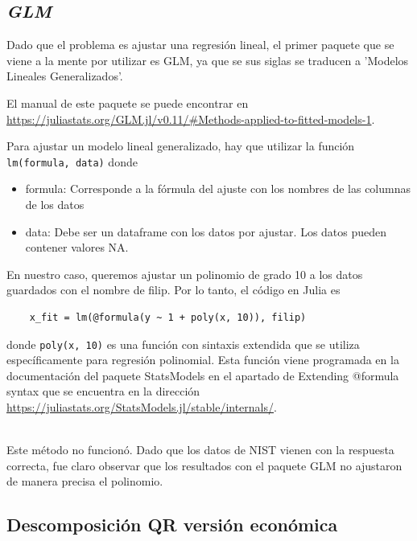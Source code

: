 \subsection{\textit{GLM}}

Dado que el problema es ajustar una regresión lineal, el primer paquete que se viene a la mente por utilizar es \textsf{GLM}, ya que se sus siglas se traducen a 'Modelos Lineales Generalizados'.


El manual de este paquete se puede encontrar en \url{https://juliastats.org/GLM.jl/v0.11/#Methods-applied-to-fitted-models-1}.  

Para ajustar un modelo lineal generalizado, hay que utilizar la función \texttt{lm(formula, data)} donde 

\begin{itemize}
    \item formula: 
    Corresponde a la fórmula del ajuste con los nombres de las columnas de los datos
    \item data:
    Debe ser un dataframe con los datos por ajustar. Los datos pueden contener valores NA. 
\end{itemize}

En nuestro caso, queremos ajustar un polinomio de grado 10 a los datos guardados con el nombre de filip. Por lo tanto, el código en Julia es

\begin{verbatim}
    x_fit = lm(@formula(y ~ 1 + poly(x, 10)), filip)
\end{verbatim}

donde \texttt{poly(x, 10)} es una función con sintaxis extendida que se utiliza específicamente para regresión polinomial. Esta función viene programada en la documentación del paquete \textsf{StatsModels} en el apartado de \textsf{Extending @formula syntax} que se encuentra en la dirección \url{https://juliastats.org/StatsModels.jl/stable/internals/}. 

\\

Este método no funcionó. Dado que los datos de NIST vienen con la respuesta correcta, fue claro observar que los resultados con el paquete GLM no ajustaron de manera precisa el polinomio. 

\subsection{Descomposición QR versión económica}

